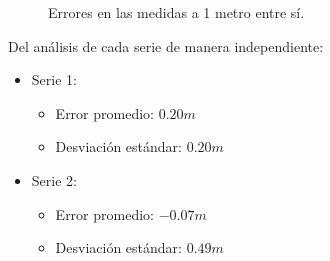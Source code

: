 \documentclass[main]{subfiles}
\begin{document}
\begin{figure}[H]
\hspace{-50pt}
  \caption{Errores en las medidas a 1 metro entre sí.}
\label{fig:1-metro-err}
\end{figure}

Del análisis de cada serie de manera independiente:
\begin{itemize}
\item Serie 1:
		\begin{itemize}
		\item Error promedio: $0.20m$
		\item Desviación estándar: $0.20m$
		\end{itemize}
\item Serie 2:
		\begin{itemize}
		\item Error promedio: $-0.07m$
		\item Desviación estándar: $0.49m$
		\end{itemize}
\end{itemize}
\end{document}

